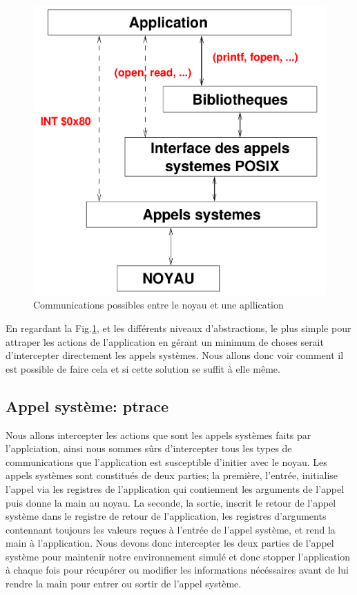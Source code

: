 \begin{figure}[H]
 \centering
 \includegraphics[scale=0.20]{Pictures/Communication_application_noyau.png}
 \caption{Communications possibles entre le noyau et une apllication}
 \label{AS_Communication}
\end{figure}

En regardant la Fig.\ref{AS_Communication}, et les différents niveaux d'abstractions, le plus simple pour attraper les actions de l'application en gérant un minimum de choses serait d'intercepter directement les appels systèmes. Nous allons donc voir comment il est possible de faire cela et si cette solution se suffit à elle même.

\subsection{Appel système: ptrace}
Nous allons intercepter les actions que sont les appels systèmes faits par
l'applciation, ainsi nous sommes sûrs d'intercepter tous les types de
communications que l'application est susceptible d'initier avec le noyau. Les
appels systèmes sont constitués de deux parties; la première, l'entrée,
initialise l'appel via les registres de l'application qui contiennent les
arguments de l'appel puis donne la main au noyau. La seconde, la sortie, inscrit
le retour de l'appel système dans le registre de retour de l'application, les
registres d'arguments contennant toujours les valeurs reçues à l'entrée de
l'appel système, et rend la main à l'application. Nous devons donc intercepter
les deux parties de l'appel système pour maintenir notre environnement simulé et
donc stopper l'application à chaque fois pour récupérer ou modifier les
informations nécéssaires avant de lui rendre la main pour entrer ou sortir de
l'appel système.

